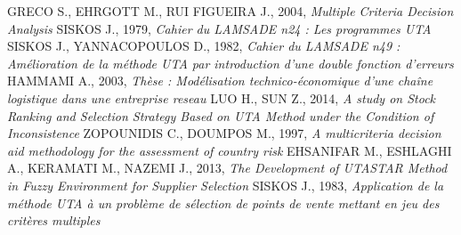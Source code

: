\documentclass{report}
\begin{document}
\begin{thebibliography}{9}
 GRECO S., EHRGOTT M., RUI FIGUEIRA J., 2004, \textit{Multiple Criteria Decision Analysis}
 SISKOS J., 1979, \textit{Cahier du LAMSADE n24 : Les programmes UTA}
 SISKOS J., YANNACOPOULOS D., 1982, \textit{Cahier du LAMSADE n49 : Amélioration de la méthode UTA par introduction d’une double fonction d’erreurs}
 HAMMAMI A., 2003, \textit{Thèse : Modélisation technico-économique d’une chaîne logistique dans une entreprise reseau}
 LUO H., SUN Z., 2014, \textit{A study on Stock Ranking and Selection Strategy Based on UTA Method under the Condition of Inconsistence}
 ZOPOUNIDIS C., DOUMPOS M., 1997, \textit{A multicriteria decision aid methodology for the assessment of country risk}
 EHSANIFAR M., ESHLAGHI A., KERAMATI M., NAZEMI J., 2013, \textit{The Development of UTASTAR Method in Fuzzy Environment for Supplier Selection}
 SISKOS J., 1983, \textit{Application de la méthode UTA à un problème de sélection de points de vente mettant en jeu des critères multiples}
\end{thebibliography}

\listoffigures
{}
\end{document}
